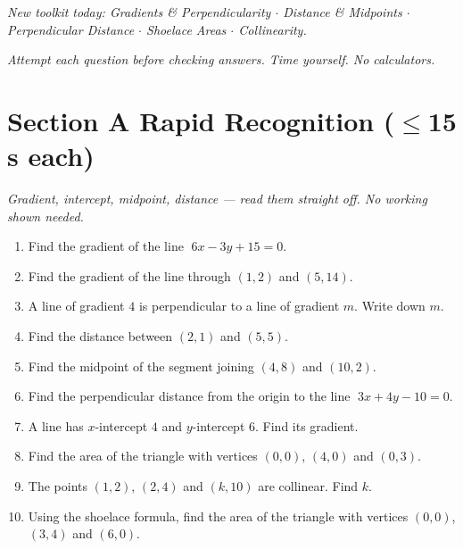 \documentclass[11pt,a4paper]{article}
\begin{document}
\noindent\textit{New toolkit today: Gradients \& Perpendicularity $\cdot$ Distance \& Midpoints $\cdot$ Perpendicular Distance $\cdot$ Shoelace Areas $\cdot$ Collinearity.}

\vspace{2pt}
\noindent\textit{Attempt each question before checking answers. Time yourself. No calculators.}

\section*{Section A \quad Rapid Recognition \hfill{\normalfont\small($\leq$15 s each)}}

\noindent\textit{Gradient, intercept, midpoint, distance --- read them straight off. No working shown needed.}

\begin{enumerate}

\item Find the gradient of the line $\;6x - 3y + 15 = 0$.

\item Find the gradient of the line through $(1,2)$ and $(5,14)$.

\item A line of gradient $4$ is perpendicular to a line of gradient $m$. Write down $m$.

\item Find the distance between $(2,1)$ and $(5,5)$.

\item Find the midpoint of the segment joining $(4,8)$ and $(10,2)$.

\item Find the perpendicular distance from the origin to the line $\;3x + 4y - 10 = 0$.

\item A line has $x$-intercept $4$ and $y$-intercept $6$. Find its gradient.

\item Find the area of the triangle with vertices $(0,0)$, $(4,0)$ and $(0,3)$.

\item The points $(1,2)$, $(2,4)$ and $(k,10)$ are collinear. Find $k$.

\item Using the shoelace formula, find the area of the triangle with vertices $(0,0)$, $(3,4)$ and $(6,0)$.

\end{enumerate}
\end{document}
